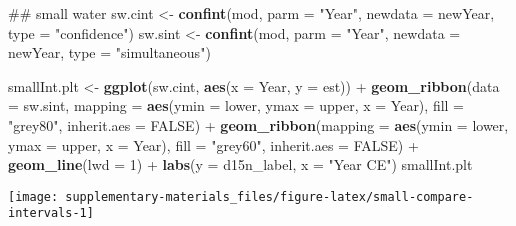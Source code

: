 \documentclass[12pt,]{article}
\newenvironment{Shaded}{\begin{snugshade}}{\end{snugshade}}
\newcommand{\KeywordTok}[1]{\textcolor[rgb]{0.13,0.29,0.53}{\textbf{{#1}}}}
\newcommand{\DataTypeTok}[1]{\textcolor[rgb]{0.13,0.29,0.53}{{#1}}}
\newcommand{\DecValTok}[1]{\textcolor[rgb]{0.00,0.00,0.81}{{#1}}}
\newcommand{\StringTok}[1]{\textcolor[rgb]{0.31,0.60,0.02}{{#1}}}
\newcommand{\OtherTok}[1]{\textcolor[rgb]{0.56,0.35,0.01}{{#1}}}
\newcommand{\NormalTok}[1]{{#1}}
\begin{document}
\begin{Shaded}
\begin{Highlighting}[]
\NormalTok{## small water}
\NormalTok{sw.cint <-}\StringTok{ }\KeywordTok{confint}\NormalTok{(mod, }\DataTypeTok{parm =} \StringTok{"Year"}\NormalTok{, }\DataTypeTok{newdata =} \NormalTok{newYear,}
                   \DataTypeTok{type =} \StringTok{"confidence"}\NormalTok{)}
\NormalTok{sw.sint <-}\StringTok{ }\KeywordTok{confint}\NormalTok{(mod, }\DataTypeTok{parm =} \StringTok{"Year"}\NormalTok{, }\DataTypeTok{newdata =} \NormalTok{newYear,}
                   \DataTypeTok{type =} \StringTok{"simultaneous"}\NormalTok{)}

\NormalTok{smallInt.plt <-}\StringTok{ }\KeywordTok{ggplot}\NormalTok{(sw.cint, }\KeywordTok{aes}\NormalTok{(}\DataTypeTok{x =} \NormalTok{Year, }\DataTypeTok{y =} \NormalTok{est)) +}
\StringTok{    }\KeywordTok{geom_ribbon}\NormalTok{(}\DataTypeTok{data =} \NormalTok{sw.sint,}
                \DataTypeTok{mapping =} \KeywordTok{aes}\NormalTok{(}\DataTypeTok{ymin =} \NormalTok{lower, }\DataTypeTok{ymax =} \NormalTok{upper, }\DataTypeTok{x =} \NormalTok{Year),}
                \DataTypeTok{fill =} \StringTok{"grey80"}\NormalTok{, }\DataTypeTok{inherit.aes =} \OtherTok{FALSE}\NormalTok{) +}
\StringTok{    }\KeywordTok{geom_ribbon}\NormalTok{(}\DataTypeTok{mapping =} \KeywordTok{aes}\NormalTok{(}\DataTypeTok{ymin =} \NormalTok{lower, }\DataTypeTok{ymax =} \NormalTok{upper, }\DataTypeTok{x =} \NormalTok{Year),}
                \DataTypeTok{fill =} \StringTok{"grey60"}\NormalTok{, }\DataTypeTok{inherit.aes =} \OtherTok{FALSE}\NormalTok{) +}
\StringTok{    }\KeywordTok{geom_line}\NormalTok{(}\DataTypeTok{lwd =} \DecValTok{1}\NormalTok{) +}
\StringTok{    }\KeywordTok{labs}\NormalTok{(}\DataTypeTok{y =} \NormalTok{d15n_label, }\DataTypeTok{x =} \StringTok{"Year CE"}\NormalTok{)}
\NormalTok{smallInt.plt}
\end{Highlighting}
\end{Shaded}

\begin{center}\texttt{[image: supplementary-materials\_files/figure-latex/small-compare-intervals-1]} \end{center}
\end{document}
